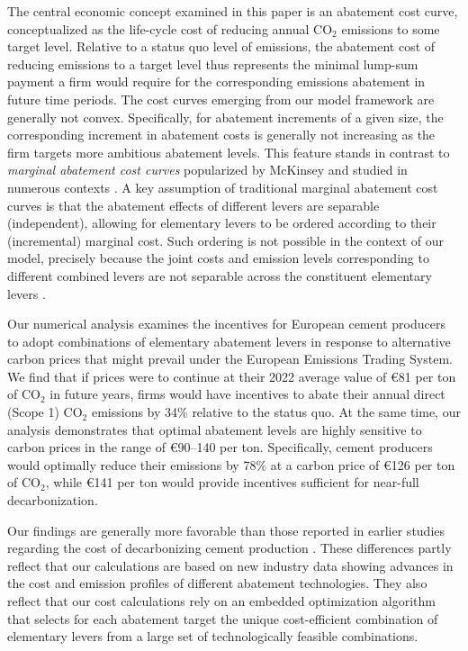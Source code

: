 \documentclass[12pt, a4paper]{article} %
\begin{document}
The central economic concept examined in this paper is an abatement cost curve, conceptualized as the life-cycle cost of reducing annual CO$_2$ emissions to some target level. Relative to a status quo level of emissions, the abatement cost of reducing emissions to a target level thus represents the minimal lump-sum payment a firm would require for the corresponding emissions abatement in future time periods. The cost curves emerging from our model framework are generally not convex. Specifically, for abatement increments of a given size, the corresponding increment in abatement costs is generally not increasing as the firm targets more ambitious abatement levels. This feature stands in contrast to \emph{marginal abatement cost curves} popularized by McKinsey \citep{mckinsey2007a} and studied in numerous contexts \citep{harmsen2019long,jiang2020the,huang2016the,lameh2022on,misconel2022model}. A key assumption of traditional marginal abatement cost curves is that the abatement effects of different levers are separable (independent), allowing for elementary levers to be ordered according to their (incremental) marginal cost. Such ordering is not possible in the context of our model, precisely because the joint costs and emission levels corresponding to different combined levers are not separable across the constituent elementary levers \citep{kesicki2012marginal,Vogt-Schilb2014marginal,mckitrick1999a,ward2014the}.

Our numerical analysis examines the incentives for European cement producers to adopt combinations of elementary abatement levers in response to alternative carbon prices that might prevail under the European Emissions Trading System. We find that if prices were to continue at their 2022 average value of \euro 81 per ton of CO$_2$ in future years, firms would have incentives to abate their annual direct (Scope 1) CO$_2$ emissions by 34\%  relative to the status quo. At the same time, our analysis demonstrates that optimal abatement levels are highly sensitive to carbon prices in the range of \euro 90--140 per ton. Specifically, cement producers would optimally reduce their emissions by 78\% at a carbon price of \euro 126 per ton of CO$_2$, while \euro 141 per ton would provide incentives sufficient for near-full decarbonization.

Our findings are generally more favorable than those reported in earlier studies regarding the cost of decarbonizing cement production \citep{obrist2021decarbonization,zuberi2017bottom,huang2021bottom,dinga2022china,fennell2022going,strunge2022marginal}. These differences partly reflect that our calculations are based on new industry data showing advances in the cost and emission profiles of different abatement technologies. They also reflect that our cost calculations rely on an embedded optimization algorithm that selects for each abatement target the unique cost-efficient combination of elementary levers from a large set of technologically feasible combinations.
\end{document}
